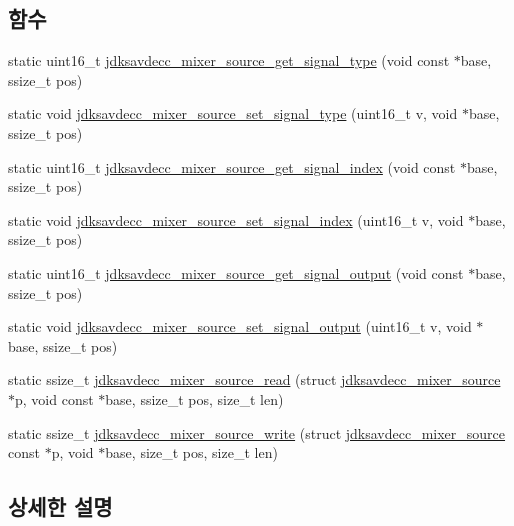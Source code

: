 \subsection*{함수}
\begin{DoxyCompactItemize}
\item 
static uint16\+\_\+t \hyperlink{group__mixer__source_ga4996aa8dd2c0e86703304f4bbafaf910}{jdksavdecc\+\_\+mixer\+\_\+source\+\_\+get\+\_\+signal\+\_\+type} (void const $\ast$base, ssize\+\_\+t pos)
\item 
static void \hyperlink{group__mixer__source_ga406771f608962aa6b61c3cf30ff30cb9}{jdksavdecc\+\_\+mixer\+\_\+source\+\_\+set\+\_\+signal\+\_\+type} (uint16\+\_\+t v, void $\ast$base, ssize\+\_\+t pos)
\item 
static uint16\+\_\+t \hyperlink{group__mixer__source_ga187ed6716ddc7ac02e90e8119f906e5a}{jdksavdecc\+\_\+mixer\+\_\+source\+\_\+get\+\_\+signal\+\_\+index} (void const $\ast$base, ssize\+\_\+t pos)
\item 
static void \hyperlink{group__mixer__source_ga2eb3d890483e745c71cbf313902bdbc9}{jdksavdecc\+\_\+mixer\+\_\+source\+\_\+set\+\_\+signal\+\_\+index} (uint16\+\_\+t v, void $\ast$base, ssize\+\_\+t pos)
\item 
static uint16\+\_\+t \hyperlink{group__mixer__source_ga73ea63e92337b38da5f5cddfd04cbd46}{jdksavdecc\+\_\+mixer\+\_\+source\+\_\+get\+\_\+signal\+\_\+output} (void const $\ast$base, ssize\+\_\+t pos)
\item 
static void \hyperlink{group__mixer__source_ga91eee06b717cf35ba2abd82af0ff236c}{jdksavdecc\+\_\+mixer\+\_\+source\+\_\+set\+\_\+signal\+\_\+output} (uint16\+\_\+t v, void $\ast$base, ssize\+\_\+t pos)
\item 
static ssize\+\_\+t \hyperlink{group__mixer__source_ga90d98b87e2541fc32fcdd305f6fb495d}{jdksavdecc\+\_\+mixer\+\_\+source\+\_\+read} (struct \hyperlink{structjdksavdecc__mixer__source}{jdksavdecc\+\_\+mixer\+\_\+source} $\ast$p, void const $\ast$base, ssize\+\_\+t pos, size\+\_\+t len)
\item 
static ssize\+\_\+t \hyperlink{group__mixer__source_ga16ada06dfdd04c7640671b987f93058f}{jdksavdecc\+\_\+mixer\+\_\+source\+\_\+write} (struct \hyperlink{structjdksavdecc__mixer__source}{jdksavdecc\+\_\+mixer\+\_\+source} const $\ast$p, void $\ast$base, size\+\_\+t pos, size\+\_\+t len)
\end{DoxyCompactItemize}


\subsection{상세한 설명}


